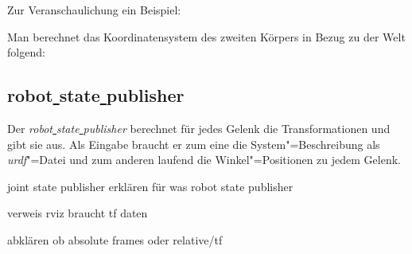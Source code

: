 Zur Veranschaulichung ein Beispiel:


Man berechnet das Koordinatensystem des zweiten Körpers in Bezug zu der Welt folgend:


\subsection{robot\underline{ }state\underline{ }publisher}
Der \textit{robot\underline{ }state\underline{ }publisher} berechnet für jedes Gelenk die Transformationen und gibt sie aus.
Als Eingabe braucht er zum eine die System"=Beschreibung als \textit{urdf}"=Datei und zum anderen laufend die Winkel"=Positionen zu jedem Gelenk.




joint state publisher erklären für was
robot state publisher

verweis rviz braucht tf daten

abklären ob absolute frames oder relative/tf

